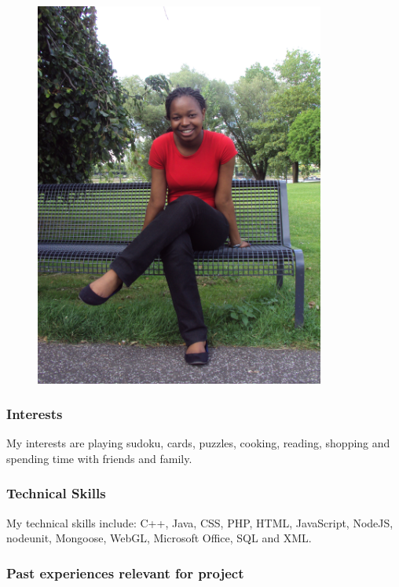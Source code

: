 \documentclass[hidelinks, 12pt, oneside]{article}
\begin{document}
\begin{figure}[h!]
  \centering
    \includegraphics[width=0.85\textwidth]{Semaka} 
\end{figure}

\subsubsection{Interests}

My interests are playing sudoku, cards, puzzles, cooking, reading, shopping and spending time with friends and family.

\subsubsection{Technical Skills}

My technical skills include: C++, Java, CSS, PHP, HTML, JavaScript, NodeJS, nodeunit, Mongoose, WebGL, Microsoft Office, SQL and XML.
 
\subsubsection{Past experiences relevant for project}
\end{document}
